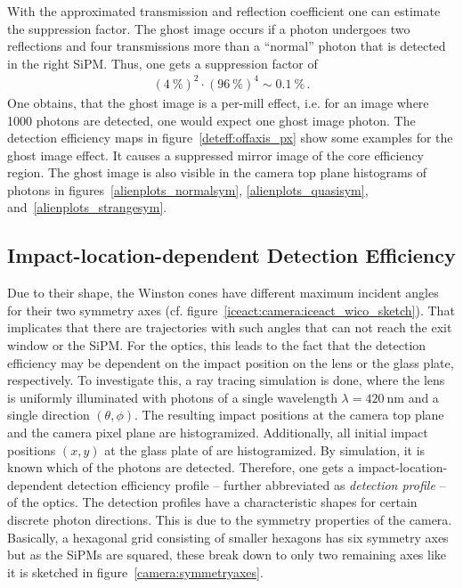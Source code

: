 With the approximated transmission and reflection coefficient one can estimate the suppression factor. The ghost image occurs if a photon undergoes two reflections and four transmissions more than a \enquote{normal} photon that is detected in the right SiPM. Thus, one gets a suppression factor of
\begin{align}
	(\SI{4}{\percent})^2 \cdot (\SI{96}{\percent})^4 \sim \SI{0.1}{\percent}\,.
\end{align}
One obtains, that the ghost image is a per-mill effect, i.e. for an image where \num{1000} photons are detected, one would expect one ghost image photon. The detection efficiency maps in figure~\ref{deteff:offaxis_px} show some examples for the ghost image effect. It causes a suppressed mirror image of the core efficiency region. The ghost image is also visible in the camera top plane histograms of photons in figures~\ref{alienplots_normalsym}, \ref{alienplots_quasisym}, and~\ref{alienplots_strangesym}.

\subsection{Impact-location-dependent Detection Efficiency}\label{sec:impactlocation}

Due to their shape, the Winston cones have different maximum incident angles for their two symmetry axes (cf. figure~\ref{iceact:camera:iceact_wico_sketch}). That implicates that there are trajectories with such angles that can not reach the exit window or the SiPM. For the optics, this leads to the fact that the detection efficiency may be dependent on the impact position on the lens or the glass plate, respectively. To investigate this, a ray tracing simulation is done, where the lens is uniformly illuminated with photons of a single wavelength $\lambda=\SI{420}{\nano\meter}$ and a single direction $(\theta,\phi)$. The resulting impact positions at the camera top plane and the camera pixel plane are histogramized. Additionally, all initial impact positions $(x,y)$ at the glass plate of are histogramized. By simulation, it is known which of the photons are detected. Therefore, one gets a impact-location-dependent detection efficiency profile -- further abbreviated as \textit{detection profile} -- of the optics.
The detection profiles have a characteristic shapes for certain discrete photon directions. This is due to the symmetry properties of the \iceact camera. Basically, a hexagonal grid consisting of smaller hexagons has six symmetry axes but as the SiPMs are squared, these break down to only two remaining axes like it is sketched in figure~\ref{camera:symmetryaxes}.\\

